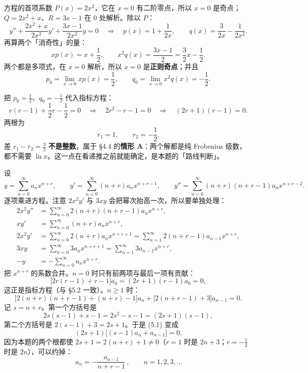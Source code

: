 \documentclass[11pt]{ctexart}
\begin{document}

方程的首项系数 $P(x)=2x^2$，它在 $x=0$ 有二阶零点，所以 $x=0$ 是奇点；$Q=2x^2+x$、$R=3x-1$ 在 $0$ 处解析。除以 $P$：
\[
y''+\frac{2x^2+x}{2x^2}y'+\frac{3x-1}{2x^2}y=0
\quad\Longrightarrow\quad
p(x)=1+\frac{1}{2x},\qquad q(x)=\frac{3}{2x}-\frac{1}{2x^2}.
\]
再算两个「消奇性」的量：
\[
xp(x)=x+\frac12,\qquad x^2q(x)=\frac{3x-1}{2}=\frac32x-\frac12 .
\]
两个都是多项式，在 $x=0$ 解析，所以 $x=0$ 是\textbf{正则奇点}；并且
\[
p_0=\lim_{x\to0}xp(x)=\frac12,\qquad q_0=\lim_{x\to0}x^2q(x)=-\frac12 .
\]



把 $p_0=\frac12$、$q_0=-\frac12$ 代入指标方程：
\[
r(r-1)+\frac12r-\frac12=0
\quad\Longrightarrow\quad
2r^2-r-1=0
\quad\Longrightarrow\quad
(2r+1)(r-1)=0 .
\]
两根为
\[
r_1=1,\qquad r_2=-\frac12 .
\]
差 $r_1-r_2=\frac32$ \textbf{不是整数}，属于 §4.4 的\textbf{情形 A}：两个解都是纯 Frobenius 级数，都不需要 $\ln x$。这一点在看递推之前就能确定，是本题的「路线判断」。



设
\[
y=\sum_{n=0}^{\infty}a_nx^{n+r},\qquad
y'=\sum_{n=0}^{\infty}(n+r)a_nx^{n+r-1},\qquad
y''=\sum_{n=0}^{\infty}(n+r)(n+r-1)a_nx^{n+r-2}.
\]
逐项乘进方程。注意 $2x^2y'$ 与 $3xy$ 会把幂次抬高一次，所以要单独处理：
\begin{align*}
2x^2y''&=\sum_{n=0}^{\infty}2(n+r)(n+r-1)a_nx^{n+r},\\
xy'&=\sum_{n=0}^{\infty}(n+r)a_nx^{n+r},\\
2x^2y'&=\sum_{n=0}^{\infty}2(n+r)a_nx^{n+r+1}
=\sum_{n=1}^{\infty}2(n+r-1)a_{n-1}x^{n+r},\\
3xy&=\sum_{n=0}^{\infty}3a_nx^{n+r+1}
=\sum_{n=1}^{\infty}3a_{n-1}x^{n+r},\\
-y&=-\sum_{n=0}^{\infty}a_nx^{n+r}.
\end{align*}
把 $x^{n+r}$ 的系数合并。$n=0$ 时只有前两项与最后一项有贡献：
\[
\bigl[2r(r-1)+r-1\bigr]a_0=(2r+1)(r-1)a_0=0,
\]
这正是指标方程（与 §5.2 一致）。$n\geq1$ 时：
\[
\bigl[2(n+r)(n+r-1)+(n+r)-1\bigr]a_n
+\bigl[2(n+r-1)+3\bigr]a_{n-1}=0 . \tag{5.1}
\]
记 $s=n+r$。第一个方括号是
\[
2s(s-1)+s-1=2s^2-s-1=(2s+1)(s-1),
\]
第二个方括号是 $2(s-1)+3=2s+1$。于是 (5.1) 变成
\[
(2s+1)\bigl[(s-1)a_n+a_{n-1}\bigr]=0 . \tag{5.2}
\]
因为本题的两个根都使 $2s+1=2(n+r)+1\neq0$（$r=1$ 时是 $2n+3$；$r=-\frac12$ 时是 $2n$），可以约掉：
\[
\boxed{\,a_n=-\frac{a_{n-1}}{n+r-1}\,},\qquad n=1,2,3,\dots \tag{5.3}
\]
\end{document}
